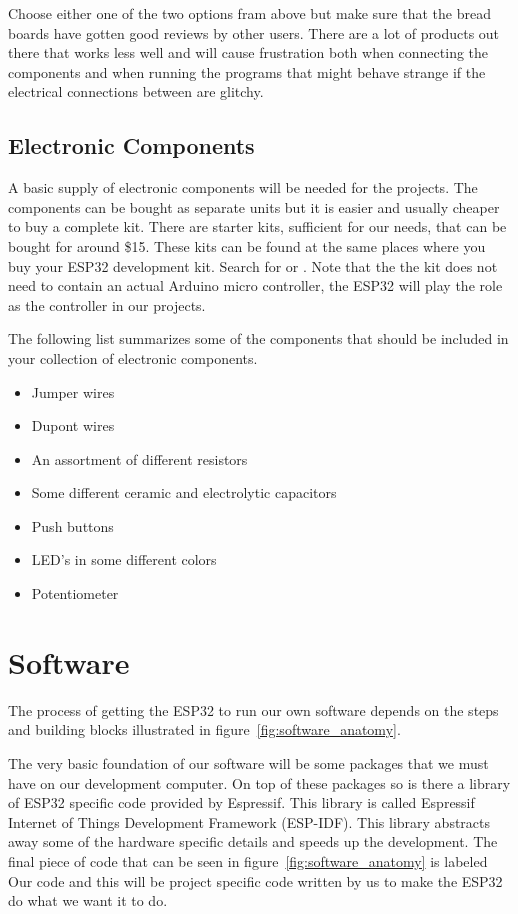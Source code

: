 \documentclass{tufte-book}
\begin{document}
Choose either one of the two options fram above but make sure that the bread
boards have gotten good reviews by other users. There are a lot of 
products out there that works less well and will cause frustration both when 
connecting the components and when running the programs that might behave 
strange if the electrical connections between are glitchy.

\subsection{Electronic Components}
A basic supply of electronic components will be needed for the projects. 
The components can be bought as separate units but it is easier and usually 
cheaper to buy a complete kit. There are starter kits, sufficient for our 
needs, that can be bought for around \$15. These kits can be found at the same 
places where you buy your ESP32 development kit. Search for 
 or . 
Note that the the kit does not need to contain an actual Arduino micro 
controller, the ESP32 will play the role as the controller in our projects.

The following list summarizes some of the components that should be included in 
your collection of electronic components.

\begin{itemize}
	\item Jumper wires
	\item Dupont wires
	\item An assortment of different resistors
	\item Some different ceramic and electrolytic capacitors
	\item Push buttons
	\item LED's in some different colors 
	\item Potentiometer
\end{itemize}

\section{Software}\label{sec:software}

The process of getting the ESP32 to run our own software depends on the steps and building blocks illustrated in figure~\ref{fig:software_anatomy}.

The very basic foundation of our software will be some packages that we must have on our development computer. On top of these packages so is there a library of ESP32 specific code provided by Espressif. This library is called Espressif Internet of Things Development Framework (ESP-IDF). This library abstracts away some of the hardware specific details and speeds up the development. The final piece of code that can be seen in figure~\ref{fig:software_anatomy} is labeled Our code and this will be project specific code written by us to make the ESP32 do what we want it to do.
\end{document}

